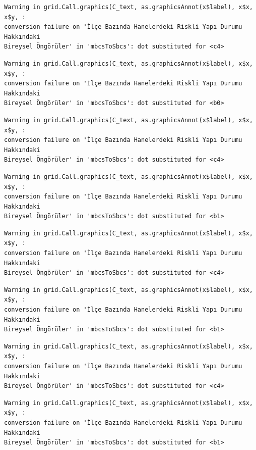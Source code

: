 \documentclass[
  11pt,
  a4paper,
  DIV=11,
  numbers=noendperiod]{scrartcl}
\begin{document}
\begin{verbatim}
Warning in grid.Call.graphics(C_text, as.graphicsAnnot(x$label), x$x, x$y, :
conversion failure on 'İlçe Bazında Hanelerdeki Riskli Yapı Durumu Hakkındaki
Bireysel Öngörüler' in 'mbcsToSbcs': dot substituted for <c4>
\end{verbatim}

\begin{verbatim}
Warning in grid.Call.graphics(C_text, as.graphicsAnnot(x$label), x$x, x$y, :
conversion failure on 'İlçe Bazında Hanelerdeki Riskli Yapı Durumu Hakkındaki
Bireysel Öngörüler' in 'mbcsToSbcs': dot substituted for <b0>
\end{verbatim}

\begin{verbatim}
Warning in grid.Call.graphics(C_text, as.graphicsAnnot(x$label), x$x, x$y, :
conversion failure on 'İlçe Bazında Hanelerdeki Riskli Yapı Durumu Hakkındaki
Bireysel Öngörüler' in 'mbcsToSbcs': dot substituted for <c4>
\end{verbatim}

\begin{verbatim}
Warning in grid.Call.graphics(C_text, as.graphicsAnnot(x$label), x$x, x$y, :
conversion failure on 'İlçe Bazında Hanelerdeki Riskli Yapı Durumu Hakkındaki
Bireysel Öngörüler' in 'mbcsToSbcs': dot substituted for <b1>
\end{verbatim}

\begin{verbatim}
Warning in grid.Call.graphics(C_text, as.graphicsAnnot(x$label), x$x, x$y, :
conversion failure on 'İlçe Bazında Hanelerdeki Riskli Yapı Durumu Hakkındaki
Bireysel Öngörüler' in 'mbcsToSbcs': dot substituted for <c4>
\end{verbatim}

\begin{verbatim}
Warning in grid.Call.graphics(C_text, as.graphicsAnnot(x$label), x$x, x$y, :
conversion failure on 'İlçe Bazında Hanelerdeki Riskli Yapı Durumu Hakkındaki
Bireysel Öngörüler' in 'mbcsToSbcs': dot substituted for <b1>
\end{verbatim}

\begin{verbatim}
Warning in grid.Call.graphics(C_text, as.graphicsAnnot(x$label), x$x, x$y, :
conversion failure on 'İlçe Bazında Hanelerdeki Riskli Yapı Durumu Hakkındaki
Bireysel Öngörüler' in 'mbcsToSbcs': dot substituted for <c4>
\end{verbatim}

\begin{verbatim}
Warning in grid.Call.graphics(C_text, as.graphicsAnnot(x$label), x$x, x$y, :
conversion failure on 'İlçe Bazında Hanelerdeki Riskli Yapı Durumu Hakkındaki
Bireysel Öngörüler' in 'mbcsToSbcs': dot substituted for <b1>
\end{verbatim}
\end{document}
